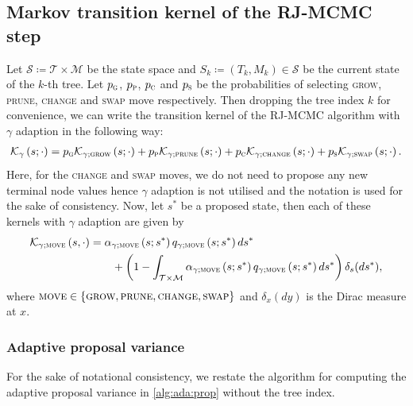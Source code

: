 \documentclass[
12pt]{article}
\begin{document}
	
	\subsection{Markov transition kernel of the RJ-MCMC step}
	
	Let $\mathcal{S}\coloneqq\mathcal{T}\times \mathcal{M}$ be the state space and $S_k\coloneqq(T_k,M_k) \in \mathcal{S}$ be the current state of the $k$-th tree. Let $p_{\textsc{g}}$, $p_{\textsc{p}}$, $p_{\textsc{c}}$ and $p_{\textsc{s}}$ be the probabilities of selecting \textsc{grow}, \textsc{prune}, \textsc{change} and \textsc{swap} move respectively. Then dropping the tree index $k$ for convenience, we can write the transition kernel of the RJ-MCMC algorithm with $\gamma$ adaption in the following way:
	\begin{align*}
		\mathcal{K}_{\gamma}\left(s; \cdot\right) 
		= p_{\textsc{g}}\mathcal{K}_{\gamma;\textsc{grow}}\left(s; \cdot\right) + 
		p_{\textsc{p}}\mathcal{K}_{\gamma;\textsc{prune}}\left(s; \cdot\right) + 
		p_{\textsc{c}}\mathcal{K}_{\gamma;\textsc{change}}\left(s; \cdot\right)+ 
		p_{\textsc{s}}\mathcal{K}_{\gamma;\textsc{swap}}\left(s; \cdot\right).
	\end{align*}
	Here, for the \textsc{change} and \textsc{swap} moves, we do not need to propose any new terminal node values hence $\gamma$ adaption is not utilised and the notation is used for the sake of consistency. Now, let $s^{\ast}$ be a proposed state, then each of these kernels with $\gamma$ adaption are given by
	\begin{align*}
		\mathcal{K}_{\gamma;\textsc{move}}\left(s, \cdot\right) 
		&= \alpha_{\gamma;\textsc{move}}\left(s;s^{\ast}\right) 
		q_{\gamma;\textsc{move}}\left(s;s^{\ast}\right)ds^{\ast} \\
		&\qquad+ \left(1 - \int_{\mathcal{T}\times\mathcal{M}} \alpha_{\gamma;\textsc{move}}\left(s;s^{\ast}\right) 
		q_{\gamma;\textsc{move}}\left(s;s^{\ast}\right)ds^{\ast}\right) \delta_{s}(ds^{\ast}),
	\end{align*}
	where $\textsc{move}\in \left\{\textsc{grow}, \textsc{prune}, \textsc{change}, \textsc{swap}\right\}$ and $\delta_x(dy)$ is the Dirac measure at $x$. 
	
	\subsubsection{Adaptive proposal variance} 
	
	For the sake of notational consistency, we restate the algorithm for computing the adaptive proposal variance in \cref{alg:ada:prop} without the tree index.
	
\end{document}
